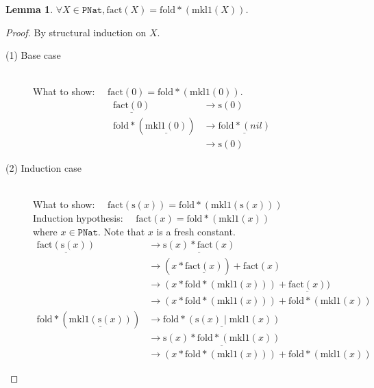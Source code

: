 \documentclass[12pt, a4paper]{article}
\newtheorem{lemma}[theorem]{Lemma}
\newcommand{\rel}[1]{\mathrel{#1}}
\newcommand{\rmx}[1]{\mathrm{#1}}
\newcommand{\larrow}{\longrightarrow}
\newcommand{\under}{\underline}
\begin{document}
\begin{lemma}
\label{lm1}
$\forall X \in \mathtt{PNat}, \rmx{fact}(X) = \rmx{fold*}(\rmx{mkl1}(X))$.
\end{lemma}
\begin{proof}
By structural induction on $X$.

\begin{description}

\item[(1) Base case]~\\
\noindent
What to show: $\quad\rmx{fact}(0) = \rmx{fold*}(\rmx{mkl1}(0))$.
\begin{align*}
\under{\rmx{fact}(0)}
	&\larrow \rmx{s}(0) \tag{by fact1} \\
\rmx{fold*}(\under{\rmx{mkl1}(0)})
	&\larrow \under{\rmx{fold*}(nil)} \tag{by mkl1-1} \\
	&\larrow \rmx{s}(0) \tag{by fold*-1}
\end{align*}

\item[(2) Induction case]~\\
What to show: $\quad\rmx{fact}(\rmx{s}(x)) = \rmx{fold*}(\rmx{mkl1}(\rmx{s}(x)))$ \\
Induction hypothesis: $\quad\rmx{fact}(x) = \rmx{fold*}(\rmx{mkl1}(x))$  \\
where $x \in \mathtt{PNat}$. Note that $x$ is a fresh constant.
\begin{align*}
\under{\rmx{fact}(\rmx{s}(x))} 
	&\larrow \under{\rmx{s}(x) \rel{*} \rmx{fact}(x)} \tag{by fact2} \\
	&\larrow (x \rel{*} \under{\rmx{fact}(x)}) \rel{+} \rmx{fact}(x) \tag{by *2} \\
	&\larrow (x \rel{*} \rmx{fold*}(\rmx{mkl1}(x))) \rel{+} \under{\rmx{fact}(x)}) \tag{by IH} \\
	&\larrow (x \rel{*} \rmx{fold*}(\rmx{mkl1}(x))) \rel{+} \rmx{fold*}(\rmx{mkl1}(x)) \tag{by IH} \\
\rmx{fold*}(\under{\rmx{mkl1}(\rmx{s}(x))})
	&\larrow \under{\rmx{fold*}(\rmx{s}(x) \rel{|} \rmx{mkl1}(x))} \tag{by mkl1-2} \\
	&\larrow \under{\rmx{s}(x) \rel{*} \rmx{fold*}(\rmx{mkl1}(x))} \tag{by fold*-2} \\
	&\larrow (x \rel{*} \rmx{fold*}(\rmx{mkl1}(x))) \rel{+} \rmx{fold*}(\rmx{mkl1}(x)) \tag{by *2}
\end{align*}

\end{description}
\end{proof}
\end{document}
